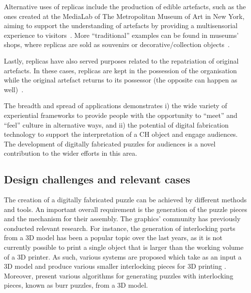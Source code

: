 \documentclass[acmlarge,screen,dvipsnames]{acmart}
\begin{document}
Alternative uses of replicas include the production of edible
artefacts, such as the ones created at the MediaLab of The
Metropolitan Museum of Art in New York, aiming to support the
understanding of artefacts by providing a multisensorial experience to
visitors~\cite{Tang2015}. More ``traditional'' examples can be found
in museums' shops, where replicas are sold as souvenirs or
decorative/collection objects~\cite{Young2017}.

Lastly, replicas have also served purposes related to the repatriation
of original artefacts. In these cases, replicas are kept in the
possession of the organisation while the original artefact returns to
its possessor (the opposite can happen as well)~\cite{Hollinger2013}.
 
The breadth and spread of applications demonstrates i) the wide
variety of experiential frameworks to provide people with the
opportunity to ``meet'' and ``feel'' culture in alternative ways, and
ii) the potential of digital fabrication technology to support the
interpretation of a CH object and engage audiences. The development of
digitally fabricated puzzles for audiences is a novel contribution to
the wider efforts in this area.
 
\subsection{Design challenges and relevant cases}
 
%
The creation of a digitally fabricated puzzle can be achieved by
different methods and tools. An important overall requirement is the
generation of the puzzle pieces and the mechanism for their
assembly. The graphics' community has previously conducted relevant
research. For instance, the generation of interlocking parts from a 3D
model has been a popular topic over the last years, as it is not
currently possible to print a single object that is larger than the
working volume of a 3D printer. As such, various systems are proposed
which take as an input a 3D model and produce various smaller
interlocking pieces for 3D printing
\cite{Song:2015:POI:2797416.2797510,luo_chopper:_2012,klein_interlocking_2014,skouras_interactive_2015}. Moreover,
\cite{Xin:2011:MBP:2010324.1964992,Song:2012:RIP:2366145.2366147,sun_computational_2015}
present various algorithms for generating puzzles with interlocking
pieces, known as burr puzzles, from a 3D model.
\end{document}
